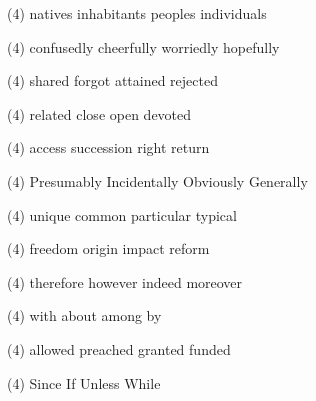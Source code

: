 \item
\begin{tasks}(4)
	\task natives
	\task inhabitants
	\task peoples
	\task individuals
\end{tasks}
\item
\begin{tasks}(4)
	\task confusedly
	\task cheerfully
	\task worriedly
	\task hopefully
\end{tasks}
\item
\begin{tasks}(4)
	\task shared
	\task forgot
	\task attained
	\task rejected
\end{tasks}
\item
\begin{tasks}(4)
	\task related
	\task close
	\task open
	\task devoted
\end{tasks}
\item
\begin{tasks}(4)
	\task access
	\task succession
	\task right
	\task return
\end{tasks}
\item
\begin{tasks}(4)
	\task Presumably
	\task Incidentally
	\task Obviously
	\task Generally
\end{tasks}
\item
\begin{tasks}(4)
	\task unique
	\task common
	\task particular
	\task typical
\end{tasks}
\item
\begin{tasks}(4)
	\task freedom
	\task origin
	\task impact
	\task reform
\end{tasks}
\item
\begin{tasks}(4)
	\task therefore
	\task however
	\task indeed
	\task moreover
\end{tasks}
\item
\begin{tasks}(4)
	\task with
	\task about
	\task among
	\task by
\end{tasks}
\item
\begin{tasks}(4)
	\task allowed
	\task preached
	\task granted
	\task funded
\end{tasks}
\item
\begin{tasks}(4)
	\task Since
	\task If
	\task Unless
	\task While
\end{tasks}
\item
